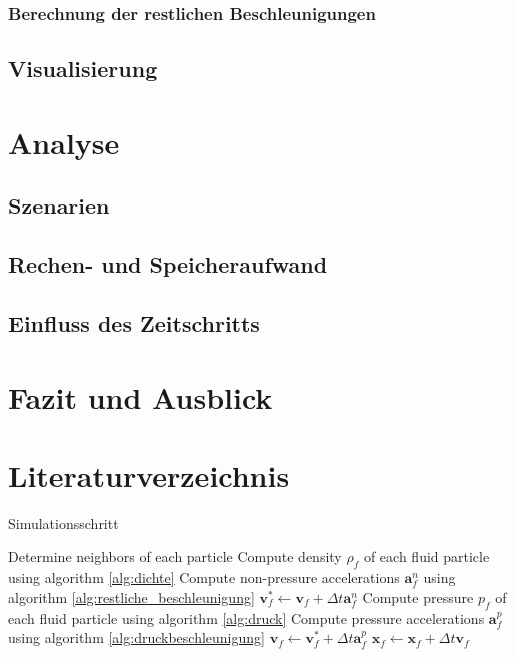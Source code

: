 \documentclass{scrreprt}
\begin{document}
\subsection{Berechnung der restlichen Beschleunigungen}
\section{Visualisierung}
\chapter{Analyse}
\section{Szenarien}
\section{Rechen- und Speicheraufwand}
\section{Einfluss des Zeitschritts}
\section{}
\chapter{Fazit und Ausblick}
\chapter{Literaturverzeichnis}



\begin{algorithm}
\caption{Simulationsschritt}
\label{alg:simulationsschritt}
\begin{algorithmic}[1]
    \STATE Determine neighbors of each particle
    \STATE Compute density $\rho_f$ of each fluid particle using algorithm \ref{alg:dichte}
    \STATE Compute non-pressure accelerations $\textbf{a}_f^n$ using algorithm \ref{alg:restliche_beschleunigung}
        \STATE $\textbf{v}_f^* \gets \textbf{v}_f + \Delta t \textbf{a}_f^n$
    \ENDFOR
    \STATE Compute pressure $p_f$ of each fluid particle using algorithm \ref{alg:druck}
    \STATE Compute pressure accelerations $\textbf{a}_f^p$ using algorithm \ref{alg:druckbeschleunigung}
        \STATE $\textbf{v}_f \gets \textbf{v}_f^* + \Delta t \textbf{a}_f^p$
    \ENDFOR
        \STATE $\textbf{x}_f \gets \textbf{x}_f + \Delta t \textbf{v}_f$
    \ENDFOR
    \STATE 
\end{algorithmic}
\end{algorithm}
\end{document}
